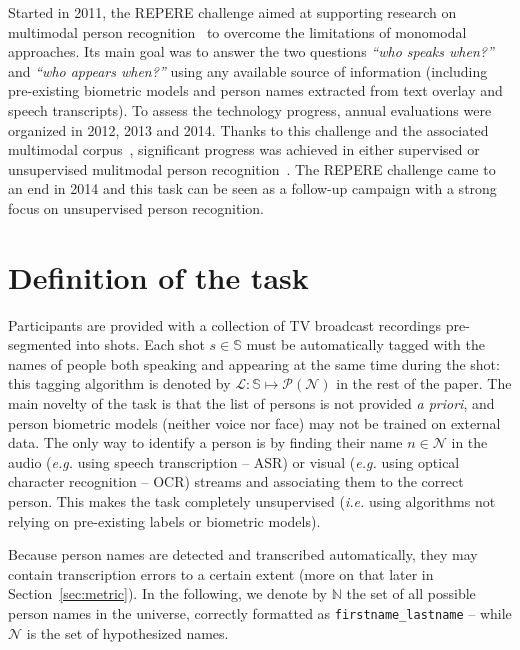 \documentclass{acm_proc_article-me}
\newcommand\refNames{\mathbb{N}}
\newcommand\shots{\mathbb{S}}
\newcommand\hypLabels{\mathcal{L}}
\newcommand\hypNames{\mathcal{N}}
\begin{document}
Started in 2011, the REPERE challenge aimed at supporting research on multimodal person recognition~\cite{BERNARD--SLAM--2013, KAHN--CBMI--2012} to overcome the limitations of monomodal approaches. Its main goal was to answer the two questions \emph{``who speaks when?''} and \emph{``who appears when?''} using any available source of information (including pre-existing biometric models and person names extracted from text overlay and speech transcripts). To assess the technology progress, annual evaluations were organized in 2012, 2013 and 2014. Thanks to this challenge and the associated multimodal corpus~\cite{GIRAUDEL--LREC--2012}, significant progress was achieved in either supervised or unsupervised mulitmodal person recognition~\cite{BECHET--INTERSPEECH--2014, BENDRIS--CBMI--2013, BREDIN--ODYSSEY--2014, BREDIN--INTERSPEECH--2013, BREDIN--SLAM--2013, BREDIN--IJMIR--2014, FAVRE--SLAM--2013, GAY--CBMI--2014, POIGNANT--ASLP--2015, POIGNANT--SLAM--2013, POIGNANT--INTERSPEECH--2012, POIGNANT--MTAP--2015, ROUVIER--CBMI--2014}.
The REPERE challenge came to an end in 2014 and this task can be seen as a follow-up campaign with a strong focus on unsupervised person recognition.

\section{Definition of the task}

Participants are provided with a collection of TV broadcast recordings pre-segmented into shots.
Each shot $s \in \shots$ must be automatically tagged with the names of people both speaking and appearing at the same time during the shot: this tagging algorithm is denoted by $\hypLabels : \shots \mapsto \mathcal{P}(\hypNames)$ in the rest of the paper.
The main novelty of the task is that the list of persons is not provided \emph{a priori}, and person biometric models (neither voice nor face) may not be trained on external data. The only way to identify a person is by finding their name $n \in \hypNames$ in the audio (\emph{e.g.} using speech transcription -- ASR) or visual (\emph{e.g.} using optical character recognition -- OCR) streams and associating them to the correct person. This makes the task completely unsupervised (\emph{i.e.} using algorithms not relying on pre-existing labels or biometric models).

Because person names are detected and transcribed automatically, they may contain transcription errors to a certain extent (more on that later in Section~\ref{sec:metric}). In the following, we denote by $\refNames$ the set of all possible person names in the universe, correctly formatted as \texttt{firstname\_lastname} -- while $\hypNames$ is the set of hypothesized names.
\end{document}
